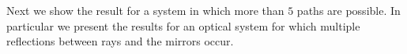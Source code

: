 
Next we show the result for a system in which more than $5$ paths are possible. 
In particular we present the results for an optical system for which multiple reflections between rays and the mirrors occur.
